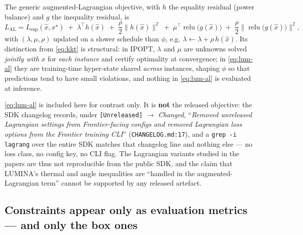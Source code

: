 \documentclass[11pt]{article}
\newcommand{\pred}[1]{\widehat{#1}}
\newcommand{\code}[1]{\texttt{\small #1}}
\newcommand{\relu}{\operatorname{relu}}
\begin{document}
The generic augmented-Lagrangian objective, with $h$ the equality residual (power balance)
and $g$ the inequality residual, is
\begin{equation}
L_{\mathrm{AL}}
= L_{\mathrm{sup}}(\pred{x},x^\star)
\;+\;\lambda^\top h(\pred{x})
\;+\;\frac{\rho}{2}\big\|h(\pred{x})\big\|^2
\;+\;\mu^\top \relu\!\big(g(\pred{x})\big)
\;+\;\frac{\rho}{2}\big\|\relu\!\big(g(\pred{x})\big)\big\|^{2} ,
\label{eq:lum-al}
\end{equation}
with $(\lambda,\mu,\rho)$ updated on a slower schedule than $\phi$, e.g.
$\lambda\leftarrow\lambda+\rho\,h(\pred{x})$. Its distinction from \eqref{eq:kkt} is
structural: in IPOPT, $\lambda$ and $\mu$ are unknowns solved \emph{jointly with} $x$ for
\emph{each instance} and certify optimality at convergence; in \eqref{eq:lum-al} they are
training-time hyper-state shared \emph{across} instances, shaping $\phi$ so that predictions
tend to have small violations, and nothing in \eqref{eq:lum-al} is evaluated at inference.

\eqref{eq:lum-al} is included here for contrast only. It is \textbf{not} the released
objective: the SDK changelog records, under \code{[Unreleased]} $\to$ \emph{Changed},
``\emph{Removed unreleased Lagrangian settings from Frontier-facing configs and removed
Lagrangian loss options from the Frontier training CLI}'' (\code{CHANGELOG.md:17}), and a
\code{grep -i lagrang} over the entire SDK matches that changelog line and nothing else ---
no loss class, no config key, no CLI flag. The Lagrangian variants studied in the papers
are thus not reproducible from the public SDK, and the claim that LUMINA's thermal and
angle inequalities are ``handled in the augmented-Lagrangian term'' cannot be supported by
any released artefact.

\subsection{Constraints appear only as evaluation metrics --- and only the box ones}
\end{document}

